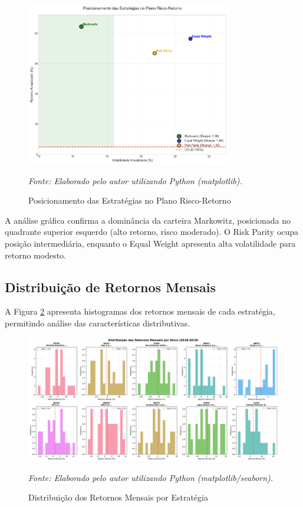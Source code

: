 \begin{figure}[H]
\centering
\includegraphics[width=0.8\textwidth]{images/risk_return_plot.png}
\caption{Posicionamento das Estratégias no Plano Risco-Retorno}
\textit{Fonte: Elaborado pelo autor utilizando Python (matplotlib).}
\label{fig:risk_return}
\end{figure}

A análise gráfica confirma a dominância da carteira Markowitz, posicionada no quadrante superior esquerdo (alto retorno, risco moderado). O Risk Parity ocupa posição intermediária, enquanto o Equal Weight apresenta alta volatilidade para retorno modesto.

\subsection{Distribuição de Retornos Mensais}

A Figura \ref{fig:returns_distribution} apresenta histogramas dos retornos mensais de cada estratégia, permitindo análise das características distributivas.

\begin{figure}[H]
\centering
\includegraphics[width=\textwidth]{images/returns_distribution.png}
\caption{Distribuição dos Retornos Mensais por Estratégia}
\textit{Fonte: Elaborado pelo autor utilizando Python (matplotlib/seaborn).}
\label{fig:returns_distribution}
\end{figure}

